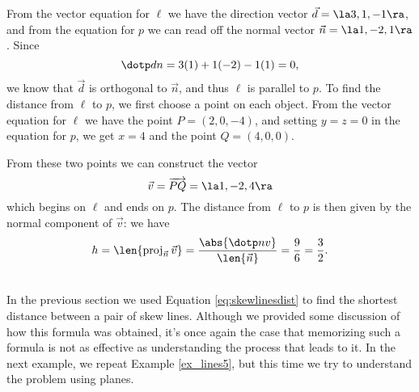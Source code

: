 {From the vector equation for $\ell$ we have the direction vector $\vec{d} = \la 3, 1, -1\ra$, and from the equation for $p$ we can read off the normal vector $\vec{n} = \la 1, -2, 1\ra$. Since
\[
\dotp dn = 3(1)+1(-2)-1(1) = 0,
\]
we know that $\vec{d}$ is orthogonal to $\vec{n}$, and thus $\ell$ is parallel to $p$. To find the distance from $\ell$ to $p$, we first choose a point on each object. From the vector equation for $\ell$ we have the point $P=(2,0,-4)$, and setting $y=z=0$ in the equation for $p$, we get $x=4$ and the point $Q=(4,0,0)$.

From these two points we can construct the vector 
\[
\vec v = \overrightarrow{PQ} = \la 1, -2, 4\ra
\]
which begins on $\ell$ and ends on $p$. The distance from $\ell$ to $p$ is then given by the normal component of $\vec{v}$: we have
\[
h = \len{\operatorname{proj}_{\vec{n}}\vec{v}} = \frac{\abs{\dotp nv}}{\len{\vec{n}}} = \frac{9}{6} = \frac{3}{2}.
\]}\\

In the previous section we used Equation \eqref{eq:skewlinesdist} to find the shortest distance between a pair of skew lines. Although we provided some discussion of how this formula was obtained, it's once again the case that memorizing such a formula is not as effective as understanding the process that leads to it. In the next example, we repeat Example \ref{ex_lines5}, but this time we try to understand the problem using planes.\\

